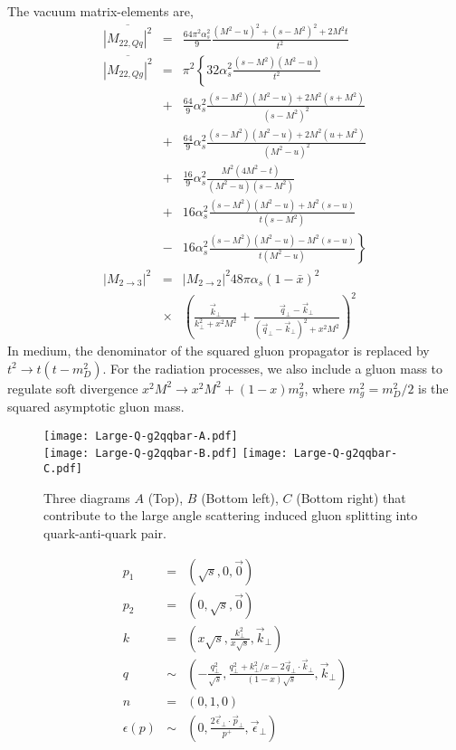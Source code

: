 The vacuum matrix-elements are,
\begin{eqnarray}
\overline{|M_{22,Qq}|^2} &=& \frac{64\pi^2\alpha_s^2}{9} \frac{(M^2-u)^2 + (s-M^2)^2 + 2 M^2 t}{t^2}
\nonumber
\\
\overline{|M_{22,Qg}|^2} &=& \pi^2 \left\{
32\alpha_s^2 \frac{(s-M^2)(M^2-u)}{t^2} \right.
\nonumber
\\
&+&\frac{64}{9}\alpha_s^2 \frac{(s-M^2)(M^2-u)+2M^2(s+M^2)}{(s-M^2)^2} \nonumber
\\
&+&\frac{64}{9}\alpha_s^2 \frac{(s-M^2)(M^2-u)+2M^2(u+M^2)}{(M^2-u)^2} \nonumber
\\
&+& \frac{16}{9}\alpha_s^2 \frac{M^2(4M^2 - t)}{(M^2-u)(s-M^2)} 
\nonumber
\\
&+& 16 \alpha_s^2 \frac{(s-M^2)(M^2-u)+M^2(s-u)}{t(s-M^2)}
\nonumber
\\
&-& \left. 16 \alpha_s^2 \frac{(s-M^2)(M^2-u)-M^2(s-u)}{t(M^2-u)}\right\}
\nonumber
\\
|M_{2\rightarrow 3}|^2 &=& |M_{2\rightarrow 2}|^2 48 \pi \alpha_s (1-\bar{x})^2
\nonumber
\\
&\times&\left(\frac{\vec{k}_\perp}{k_\perp^2 + x^2 M^2} + \frac{\vec{q}_\perp - \vec{k}_\perp}{(\vec{q}_\perp-\vec{k}_\perp)^2 + x^2 M^2}
\right)^2 
\end{eqnarray}
In medium, the denominator of the squared gluon propagator is replaced by $t^2 \rightarrow t(t-m_D^2)$. 
For the radiation processes, we also include a gluon mass to regulate soft divergence $x^2M^2 \rightarrow x^2M^2 + (1-x)m_g^2$, where $m_g^2 = m_D^2/2$ is the squared asymptotic gluon mass. 

\begin{figure}
\centering
\texttt{[image: Large-Q-g2qqbar-A.pdf]}\\
\vspace{1em}
\texttt{[image: Large-Q-g2qqbar-B.pdf]}\hfill
\texttt{[image: Large-Q-g2qqbar-C.pdf]}
\caption{Three diagrams $A$ (Top), $B$ (Bottom left), $C$ (Bottom right) that contribute to the large angle scattering induced gluon splitting into quark-anti-quark pair.}
\end{figure}


\begin{eqnarray}
p_1 &=& (\sqrt{s}, 0, \vec{0})\\
p_2 &=& (0, \sqrt{s}, \vec{0})\\
k &=& (x\sqrt{s}, \frac{k_\perp^2}{x\sqrt{s}}, \vec{k}_\perp)\\
q &\sim& (-\frac{q_\perp^2}{\sqrt{s}}, \frac{q_\perp^2 + k_\perp^2/x - 2\vec{q}_\perp \cdot \vec{k}_\perp}{(1-x)\sqrt{s}}, \vec{k}_\perp)\\
n &=& (0, 1, 0)\\
\epsilon(p) &\sim& (0, \frac{2\vec{\epsilon}_\perp\cdot\vec{p}_\perp}{p^+}, \vec{\epsilon}_\perp)
\end{eqnarray}

